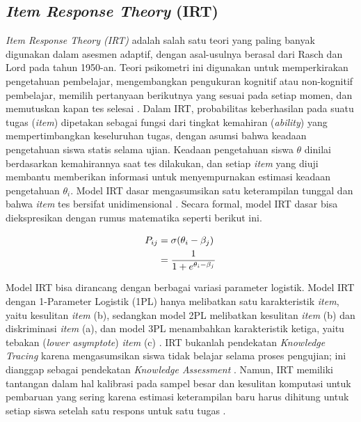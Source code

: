 \subsection{\textit{Item Response Theory} (IRT)}
\textit{Item Response Theory (IRT)} adalah salah satu teori yang paling banyak
digunakan dalam asesmen adaptif, dengan asal-usulnya berasal dari Rasch dan Lord 
pada tahun 1950-an. Teori psikometri ini digunakan untuk memperkirakan pengetahuan 
pembelajar, mengembangkan pengukuran kognitif atau non-kognitif pembelajar, memilih 
pertanyaan berikutnya yang sesuai pada setiap momen, dan memutuskan kapan tes selesai 
\autocite{Ihichr2024}. Dalam IRT, probabilitas keberhasilan pada suatu tugas 
(\textit{item}) dipetakan sebagai fungsi dari tingkat kemahiran (\textit{ability}) 
yang mempertimbangkan keseluruhan tugas, dengan asumsi bahwa keadaan pengetahuan 
siswa statis selama ujian. Keadaan pengetahuan siswa $\theta$ dinilai berdasarkan
kemahirannya saat tes dilakukan, dan setiap \textit{item} yang diuji membantu
memberikan informasi untuk menyempurnakan estimasi keadaan pengetahuan $\theta_{i}$. 
Model IRT dasar mengasumsikan satu keterampilan tunggal dan bahwa \textit{item} 
tes bersifat unidimensional \autocite{Minn2022}. Secara formal, model IRT dasar
bisa diekspresikan dengan rumus matematika seperti berikut ini.

\begin{align}
P_{ij} &= \sigma(\theta_i - \beta_j) \notag \\
     &= \frac{1}{1 + e^{\theta_i - \beta_j}} \label{eq:rumus_irt}
\end{align}

Model IRT bisa dirancang dengan berbagai variasi parameter logistik.
Model IRT dengan 1-Parameter Logistik 
(1PL) hanya melibatkan satu karakteristik \textit{item}, yaitu kesulitan 
\textit{item} (b), sedangkan model 2PL melibatkan kesulitan \textit{item} (b) 
dan diskriminasi \textit{item} (a), dan model 3PL menambahkan karakteristik 
ketiga, yaitu tebakan (\textit{lower asymptote}) \textit{item} (c) 
\autocite{Handayani2025}. IRT bukanlah pendekatan \textit{Knowledge Tracing} 
karena mengasumsikan siswa tidak belajar selama proses pengujian; ini dianggap 
sebagai pendekatan \textit{Knowledge Assessment} \autocite{Minn2022}. Namun, IRT 
memiliki tantangan dalam hal kalibrasi pada sampel besar dan kesulitan komputasi 
untuk pembaruan yang sering karena estimasi keterampilan baru harus dihitung untuk 
setiap siswa setelah satu respons untuk satu tugas \autocite{Vesin2022}.

